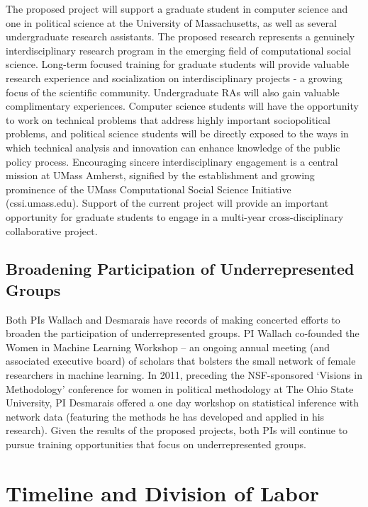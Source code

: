 The proposed project will support a graduate student in computer science and one in political science at the University of Massachusetts, as well as several undergraduate research assistants.  The proposed research represents a genuinely interdisciplinary research program in the emerging field of computational social science. Long-term focused training for graduate students will provide valuable research experience and socialization on interdisciplinary projects - a growing focus of the scientific community. Undergraduate RAs will also gain valuable complimentary experiences. Computer science students will have the opportunity to work on technical problems that address highly important sociopolitical problems, and political science students will be directly exposed to the ways in which technical analysis and innovation can enhance knowledge of the public policy process. Encouraging sincere interdisciplinary engagement is a central mission at UMass Amherst, signified by the establishment and growing prominence of the UMass Computational Social Science Initiative (cssi.umass.edu). Support of the current project will provide an important opportunity for graduate students to engage in a multi-year cross-disciplinary collaborative project.

\subsection{Broadening Participation of Underrepresented Groups}

Both PIs Wallach and Desmarais have records of making concerted
efforts to broaden the participation of underrepresented groups. PI
Wallach co-founded the Women in Machine Learning Workshop -- an
ongoing annual meeting (and associated executive board) of scholars
that bolsters the small network of female researchers in machine
learning. In 2011, preceding the NSF-sponsored `Visions in
Methodology' conference for women in political methodology at The Ohio
State University, PI Desmarais offered a one day workshop on
statistical inference with network data (featuring the methods he has
developed and applied in his research). Given the results of the
proposed projects, both PIs will continue to pursue training
opportunities that focus on underrepresented groups.




\section{Timeline and Division of Labor}

